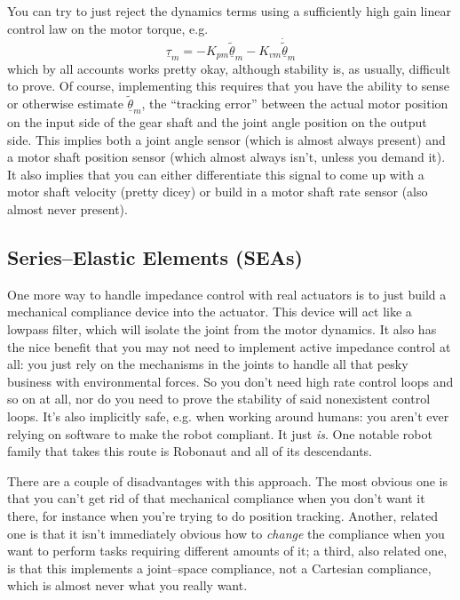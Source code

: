 \documentclass[]{article}
\begin{document}
You can try to just reject the dynamics terms using a sufficiently high gain linear control law on the motor torque, e.g.
\begin{displaymath}
 \underline{\tau}_{m} = -K_{pm}\underline{\tilde{\theta}}_{m} - K_{vm}\underline{\dot{\tilde{\theta}}}_{m} 
\end{displaymath}
which by all accounts works pretty okay, although stability is, as usually, difficult to prove. Of course, implementing this requires that you have the ability to sense or otherwise estimate $\tilde{\underline{\theta}}_{m}$, the ``tracking error'' between the actual motor position on the input side of the gear shaft and the joint angle position on the output side. This implies both a joint angle sensor (which is almost always present) and a motor shaft position sensor (which almost always isn't, unless you demand it). It also implies that you can either differentiate this signal to come up with a motor shaft velocity (pretty dicey) or build in a motor shaft rate sensor (also almost never present).

\subsection{Series--Elastic Elements (SEAs)}
One more way to handle impedance control with real actuators is to just build a mechanical compliance device into the actuator. This device will act like a lowpass filter, which will isolate the joint from the motor dynamics. It also has the nice benefit that you may not need to implement active impedance control at all: you just rely on the mechanisms in the joints to handle all that pesky business with environmental forces. So you don't need high rate control loops and so on at all, nor do you need to prove the stability of said nonexistent control loops. It's also implicitly safe, e.g. when working around humans: you aren't ever relying on software to make the robot compliant. It just \textit{is}. One notable robot family that takes this route is Robonaut and all of its descendants.

There are a couple of disadvantages with this approach. The most obvious one is that you can't get rid of that mechanical compliance when you don't want it there, for instance when you're trying to do position tracking. Another, related one is that it isn't immediately obvious how to \textit{change} the compliance when you want to perform tasks requiring different amounts of it; a third, also related one, is that this implements a joint--space compliance, not a Cartesian compliance, which is almost never what you really want.
\end{document}
